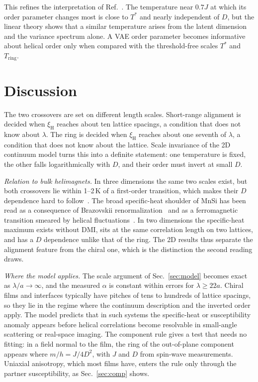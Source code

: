 \documentclass[prb,reprint,longbibliography,superscriptaddress,amsmath,amssymb]{revtex4-2}
\newcommand{\Ts}{T^{*}}
\newcommand{\Tr}{T_{\mathrm{ring}}}
\newcommand{\xiH}{\xi_{\mathrm{H}}}
\begin{document}
This refines the interpretation of Ref.~\cite{Yoon2024}. The temperature near $0.7J$ at which its order parameter changes most is close to $\Ts$ and nearly independent of $D$, but the linear theory shows that a similar temperature arises from the latent dimension and the variance spectrum alone. A VAE order parameter becomes informative about helical order only when compared with the threshold-free scales $\Ts$ and $\Tr$.

\section{Discussion}
\label{sec:disc}

The two crossovers are set on different length scales. Short-range alignment is decided when $\xiH$ reaches about ten lattice spacings, a condition that does not know about $\lambda$. The ring is decided when $\xiH$ reaches about one seventh of $\lambda$, a condition that does not know about the lattice. Scale invariance of the 2D continuum model turns this into a definite statement: one temperature is fixed, the other falls logarithmically with $D$, and their order must invert at small $D$.

\textit{Relation to bulk helimagnets.} In three dimensions the same two scales exist, but both crossovers lie within 1--2\,K of a first-order transition, which makes their $D$ dependence hard to follow~\cite{Grigoriev2011,Janoschek2013}. The broad specific-heat shoulder of MnSi has been read as a consequence of Brazovskii renormalization~\cite{Janoschek2013} and as a ferromagnetic transition smeared by helical fluctuations~\cite{BelemukStishov2017}. In two dimensions the specific-heat maximum exists without DMI, sits at the same correlation length on two lattices, and has a $D$ dependence unlike that of the ring. The 2D results thus separate the alignment feature from the chiral one, which is the distinction the second reading draws.

\textit{Where the model applies.} The scale argument of Sec.~\ref{sec:model} becomes exact as $\lambda/a\to\infty$, and the measured $\alpha$ is constant within errors for $\lambda\ge22a$. Chiral films and interfaces typically have pitches of tens to hundreds of lattice spacings, so they lie in the regime where the continuum description and the inverted order apply. The model predicts that in such systems the specific-heat or susceptibility anomaly appears before helical correlations become resolvable in small-angle scattering or real-space imaging. The component rule gives a test that needs no fitting: in a field normal to the film, the ring of the out-of-plane component appears where $m/h=J/4D^2$, with $J$ and $D$ from spin-wave measurements. Uniaxial anisotropy, which most films have, enters the rule only through the partner susceptibility, as Sec.~\ref{sec:comp} shows.
\end{document}
